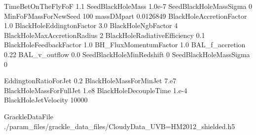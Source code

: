 TimeBetOnTheFlyFoF           1.1            %
SeedBlackHoleMass            1.0e-7     %
SeedBlackHoleMassSigma       0
MinFoFMassForNewSeed         100      %
massDMpart                   0.0126849      %
BlackHoleAccretionFactor     1.0            %
BlackHoleEddingtonFactor     3.0           %
BlackHoleNgbFactor           4              %
BlackHoleMaxAccretionRadius  2              %
BlackHoleRadiativeEfficiency 0.1        %
BlackHoleFeedbackFactor      1.0	    %
BH_FluxMomentumFactor        1.0	    %
BAL_f_accretion              0.22        %
BAL_v_outflow                0.0	    %
SeedBlackHoleMinRedshift     0 
SeedBlackHoleMassSigma       0

EddingtonRatioForJet         0.2	%
BlackHoleMassForMinJet       7.e7       %
BlackHoleMassForFullJet      1.e8       %
BlackHoleDecoupleTime        1.e-4      %
BlackHoleJetVelocity         10000	%

GrackleDataFile		    ./param_files/grackle_data_files/CloudyData_UVB=HM2012_shielded.h5 %
